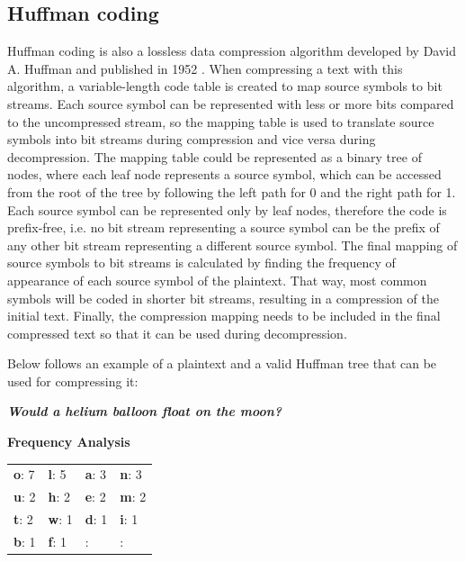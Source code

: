\subsection{Huffman coding}\label{subsec:huffman}

Huffman coding is also a lossless data compression algorithm developed by David
A. Huffman and published in 1952 \cite{huffman}. When compressing a text with
this algorithm, a variable-length code table is created to map source symbols to
bit streams. Each source symbol can be represented with less or more bits
compared to the uncompressed stream, so the mapping table is used to translate
source symbols into bit streams during compression and vice versa during
decompression. The mapping table could be represented as a binary tree of nodes,
where each leaf node represents a source symbol, which can be accessed from the 
root of the tree by following the left path for 0 and the right path for 1. Each
source symbol can be represented only by leaf nodes, therefore the code is
prefix-free, i.e. no bit stream representing a source symbol can be the prefix
of any other bit stream representing a different source symbol. The final
mapping of source symbols to bit streams is calculated by finding the frequency
of appearance of each source symbol of the plaintext. That way, most common
symbols will be coded in shorter bit streams, resulting in a compression of the 
initial text. Finally, the compression mapping needs to be included in the final
compressed text so that it can be used during decompression.

Below follows an example of a plaintext and a valid Huffman tree that can be
used for compressing it:

\bigskip \centerline{\textit{\textbf{Would a helium balloon float on the moon?}}}

\bigskip \centerline{\textbf{Frequency Analysis}}

\begin{table}[H] \centering \begin{tabular}{ | l | l | l | l | } \hline
\textbf{o}: 7 & \textbf{l}: 5 & \textbf{a}: 3 & \textbf{n}: 3 \\ \textbf{u}: 2 &
\textbf{h}: 2 & \textbf{e}: 2 & \textbf{m}: 2 \\ \textbf{t}: 2 & \textbf{w}: 1 &
\textbf{d}: 1 & \textbf{i}: 1 \\ \textbf{b}: 1 & \textbf{f}: 1 & \textbf{}:  & \textbf{}:
\\ \hline \end{tabular} \end{table}

